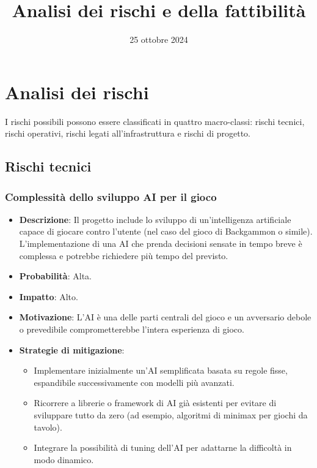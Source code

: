 \documentclass[12pt,a4paper]{report}
\title{Analisi dei rischi e della fattibilità}
\date{25 ottobre 2024}
\begin{document}
\maketitle
\thispagestyle{empty}

\newpage
{}

\chapter*{Analisi dei rischi}
\setcounter{section}{0}

I rischi possibili possono essere classificati in quattro macro-classi: rischi tecnici, rischi operativi, rischi legati all’infrastruttura e rischi di progetto.

\section{Rischi tecnici}
\subsection{Complessità dello sviluppo AI per il gioco}
\begin{itemize}
    \item \textbf{Descrizione}: Il progetto include lo sviluppo di un'intelligenza artificiale capace di giocare contro l'utente (nel caso del gioco di Backgammon o simile). L'implementazione di una AI che prenda decisioni sensate in tempo breve è complessa e potrebbe richiedere più tempo del previsto.
    \item \textbf{Probabilità}: Alta.
    \item \textbf{Impatto}: Alto.
    \item \textbf{Motivazione}: L’AI è una delle parti centrali del gioco e un avversario debole o prevedibile comprometterebbe l’intera esperienza di gioco.
    \item \textbf{Strategie di mitigazione}:
    \begin{itemize}
        \item Implementare inizialmente un’AI semplificata basata su regole fisse, espandibile successivamente con modelli più avanzati.
        \item Ricorrere a librerie o framework di AI già esistenti per evitare di sviluppare tutto da zero (ad esempio, algoritmi di minimax per giochi da tavolo).
        \item Integrare la possibilità di tuning dell’AI per adattarne la difficoltà in modo dinamico.
    \end{itemize}
\end{itemize}
\end{document}
